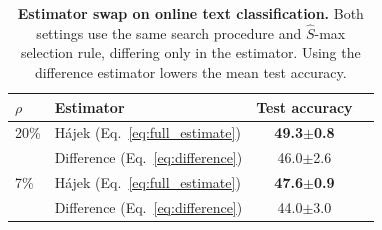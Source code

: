 \begin{table}[b!]
\centering
\caption{\textbf{Estimator swap on online text classification.}
Both settings use the same search procedure and $\hat{S}$-max selection rule, differing only in the estimator. Using the difference estimator lowers the mean test accuracy.}
\label{table:estimator_swap}
\small
\setlength{\tabcolsep}{6pt}
\begin{tabular}{llcc}
\toprule
$\rho$ & Estimator & Test accuracy \\
\midrule
20\% & H\'ajek (Eq.~\ref{eq:full_estimate}) & \textbf{49.3\scriptsize$\pm$0.8} \\
 & Difference (Eq.~\ref{eq:difference}) & 46.0\scriptsize$\pm$2.6 \\
\midrule
7\% & H\'ajek (Eq.~\ref{eq:full_estimate}) & \textbf{47.6\scriptsize$\pm$0.9} \\
 & Difference (Eq.~\ref{eq:difference}) & 44.0\scriptsize$\pm$3.0 \\
\bottomrule
\end{tabular}
\end{table}
